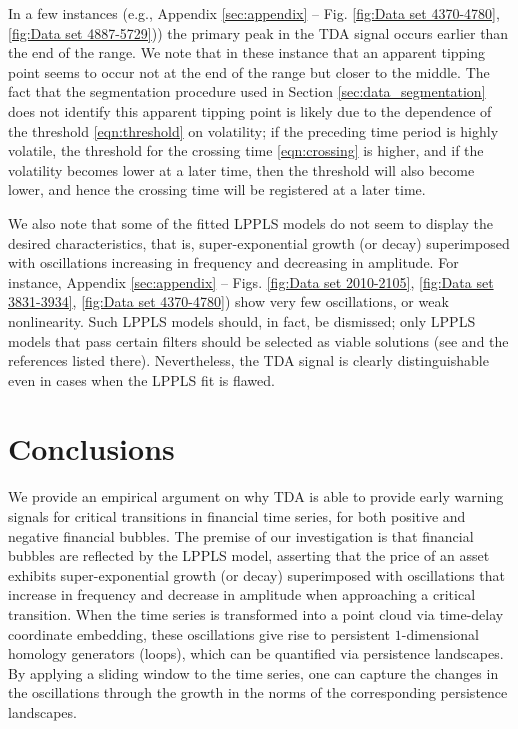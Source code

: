 \documentclass[11pt]{amsart}
\theoremstyle{definition}
\theoremstyle{remark}
\numberwithin{equation}{section}
\begin{document}
In a few instances (e.g.,  Appendix  \ref {sec:appendix} -- Fig.  \ref{fig:Data set 4370-4780}, \ref{fig:Data set 4887-5729})) the primary peak in the TDA signal  occurs earlier than the end of the range.
We note that in these instance that an  apparent tipping point seems to occur not at the end of the range but closer to the middle. The fact that the segmentation procedure used in Section \ref{sec:data_segmentation} does not identify this apparent tipping point is  likely due to the dependence of the  threshold \eqref{eqn:threshold} on volatility; if the preceding time period is highly volatile, the threshold for  the crossing time \eqref{eqn:crossing} is higher, and if the volatility becomes lower at a later time, then the threshold will also become lower, and hence the crossing time will be registered at a later time.

We also note that some of the fitted LPPLS models do not seem to display the desired characteristics, that is, super-exponential growth (or decay)  superimposed with oscillations increasing in frequency and decreasing in amplitude. For instance,   Appendix  \ref {sec:appendix} -- Figs. \ref{fig:Data set 2010-2105}, \ref{fig:Data set 3831-3934}, \ref{fig:Data set 4370-4780}) show very few oscillations, or weak nonlinearity. Such LPPLS models should, in fact, be dismissed;  only  LPPLS models that pass certain filters should be selected as viable solutions (see \cite{gerlach2018dissection} and the references listed there). Nevertheless, the TDA signal is clearly distinguishable even in cases when the LPPLS fit is  flawed.


\section{Conclusions}

We provide  an empirical argument on why TDA is able to provide early warning signals for critical transitions in financial time series, for both positive and negative financial bubbles.  The premise of our investigation is that financial bubbles are reflected by the LPPLS model,
asserting that the price of an asset exhibits  super-exponential growth (or decay)  superimposed with oscillations that  increase in frequency and decrease in amplitude when approaching a critical transition. When the time series is transformed into a point cloud via time-delay coordinate embedding, these oscillations give rise to persistent $1$-dimensional homology generators (loops), which can be quantified via persistence landscapes.  By applying a sliding window to the time series, one can capture the changes in the oscillations through the growth in the norms of the corresponding persistence landscapes.
\end{document}
